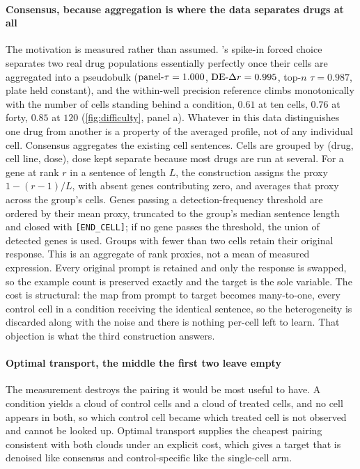 \paragraph{Consensus, because aggregation is where the data separates drugs at
all} The motivation is measured rather than assumed. 's
spike-in forced choice separates two real drug populations essentially perfectly
once their cells are aggregated into a pseudobulk ($\textrm{panel-}\tau = 1.000$,
$\textrm{DE-}\Delta r = 0.995$, top-$n$ $\tau = 0.987$, plate held constant), and the within-well
precision reference climbs monotonically with the number of cells standing behind
a condition, $0.61$ at ten cells, $0.76$ at forty, $0.85$ at $120$
(\cref{fig:difficulty}, panel a). Whatever in this data distinguishes one drug
from another is a property of the averaged profile, not of any individual cell.
Consensus aggregates the existing cell sentences. Cells are grouped by
(drug, cell line, dose), dose kept separate because most drugs are run at several.
For a gene at rank $r$ in a sentence of length $L$, the construction assigns
the proxy $1-(r-1)/L$, with absent genes contributing zero, and averages that
proxy across the group's cells. Genes passing a detection-frequency threshold
are ordered by their mean proxy, truncated to the group's median sentence
length and closed with \texttt{[END\_CELL]}; if no gene passes the threshold,
the union of detected genes is used. Groups with fewer than two cells retain
their original response. This is an aggregate of rank proxies, not a mean of
measured expression. Every original prompt is retained and only the response is
swapped, so the example count is preserved exactly and the target is the sole
variable. The cost is structural: the map from prompt to target becomes
many-to-one, every control cell in a condition receiving the identical sentence,
so the heterogeneity is discarded along with the noise and there is nothing
per-cell left to learn. That objection is what the third construction answers.

\paragraph{Optimal transport, the middle the first two leave empty} The
measurement destroys the pairing it would be most useful to have. A condition
yields a cloud of control cells and a cloud of treated cells, and no cell appears
in both, so which control cell became which treated cell is not observed and
cannot be looked up. Optimal transport supplies the cheapest pairing consistent
with both clouds under an explicit cost, which gives a target that is denoised
like consensus and control-specific like the single-cell arm.

